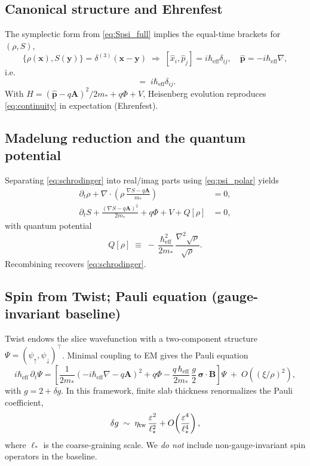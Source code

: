 \subsection{Canonical structure and Ehrenfest}
\label{sec:QM_ops}

The symplectic form from \eqref{eq:Spsi_full} implies the equal-time brackets for \((\rho,S)\),
\[
\{\rho(\mathbf{x}),S(\mathbf{y})\}=\delta^{(3)}(\mathbf{x}-\mathbf{y}) \;\Rightarrow\; [\hat{x}_i,\hat{p}_j]= i\hbar_{\mathrm{eff}}\delta_{ij},\quad \hat{\mathbf p}=-i\hbar_{\mathrm{eff}}\nabla ,
\]
i.e.
\begin{equation}
[\hat{x}_i,\hat{p}_j] \;=\; i\hbar_{\mathrm{eff}}\delta_{ij}.
\label{eq:commutator}
\end{equation}
With \(\hat H = (\hat{\mathbf p}-q\mathbf A)^2/2m_* + q\Phi + V\), Heisenberg evolution reproduces \eqref{eq:continuity} in expectation (Ehrenfest).

\subsection{Madelung reduction and the quantum potential}
\label{sec:QM_madelung_detail}

Separating \eqref{eq:schrodinger} into real/imag parts using \eqref{eq:psi_polar} yields
\begin{align}
\partial_t \rho + \nabla\!\cdot\!\left(\rho\,\frac{\nabla S - q\mathbf A}{m_*}\right) &= 0, 
\label{eq:HJ_cont_redux}\\
\partial_t S + \frac{(\nabla S - q\mathbf A)^2}{2m_*} + q\Phi + V + Q[\rho] &= 0,
\label{eq:HJ_quantum}
\end{align}
with quantum potential
\begin{equation}
Q[\rho] \;\equiv\; -\,\frac{\hbar_{\mathrm{eff}}^{2}}{2m_*}\,\frac{\nabla^2\sqrt{\rho}}{\sqrt{\rho}} .
\label{eq:Q_potential}
\end{equation}
Recombining recovers \eqref{eq:schrodinger}.

\subsection{Spin from Twist; Pauli equation (gauge-invariant baseline)}
\label{sec:QM_spin}

Twist endows the slice wavefunction with a two-component structure \(\Psi=(\psi_\uparrow,\psi_\downarrow)^\top\). Minimal coupling to EM gives the Pauli equation
\begin{equation}
i\hbar_{\mathrm{eff}}\,\partial_t \Psi
= \left[\frac{1}{2m_*}\!\left(-i\hbar_{\mathrm{eff}}\nabla - q\mathbf{A}\right)^2 + q\Phi - \frac{q\,\hbar_{\mathrm{eff}}}{2m_*}\,\frac{g}{2}\,\boldsymbol{\sigma}\!\cdot\!\mathbf{B} \right]\Psi
\;+\; O\!\left((\xi/\rho)^2\right),
\label{eq:pauli}
\end{equation}
with \(g=2+\delta g\). In this framework, finite slab thickness renormalizes the Pauli coefficient,
\[
\delta g \;\sim\; \eta_{\rm tw}\,\frac{\varepsilon^2}{\ell_*^2} + O\!\left(\frac{\varepsilon^4}{\ell_*^4}\right),
\]
where \(\ell_*\) is the coarse-graining scale. We \emph{do not} include non-gauge-invariant spin operators in the baseline.

